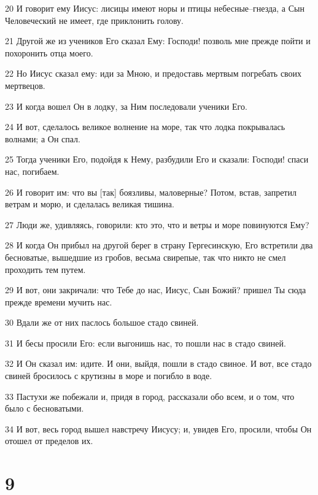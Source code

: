 \par 20 И говорит ему Иисус: лисицы имеют норы и птицы небесные--гнезда, а Сын Человеческий не имеет, где приклонить голову.
\par 21 Другой же из учеников Его сказал Ему: Господи! позволь мне прежде пойти и похоронить отца моего.
\par 22 Но Иисус сказал ему: иди за Мною, и предоставь мертвым погребать своих мертвецов.
\par 23 И когда вошел Он в лодку, за Ним последовали ученики Его.
\par 24 И вот, сделалось великое волнение на море, так что лодка покрывалась волнами; а Он спал.
\par 25 Тогда ученики Его, подойдя к Нему, разбудили Его и сказали: Господи! спаси нас, погибаем.
\par 26 И говорит им: что вы [так] боязливы, маловерные? Потом, встав, запретил ветрам и морю, и сделалась великая тишина.
\par 27 Люди же, удивляясь, говорили: кто это, что и ветры и море повинуются Ему?
\par 28 И когда Он прибыл на другой берег в страну Гергесинскую, Его встретили два бесноватые, вышедшие из гробов, весьма свирепые, так что никто не смел проходить тем путем.
\par 29 И вот, они закричали: что Тебе до нас, Иисус, Сын Божий? пришел Ты сюда прежде времени мучить нас.
\par 30 Вдали же от них паслось большое стадо свиней.
\par 31 И бесы просили Его: если выгонишь нас, то пошли нас в стадо свиней.
\par 32 И Он сказал им: идите. И они, выйдя, пошли в стадо свиное. И вот, все стадо свиней бросилось с крутизны в море и погибло в воде.
\par 33 Пастухи же побежали и, придя в город, рассказали обо всем, и о том, что было с бесноватыми.
\par 34 И вот, весь город вышел навстречу Иисусу; и, увидев Его, просили, чтобы Он отошел от пределов их.

\chapter{9}

